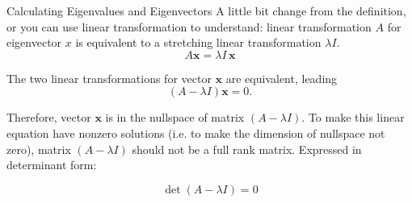 \documentclass{beamer}
\begin{document}
    \begin{frame}{Calculating Eigenvalues and Eigenvectors}
        A little bit change from the definition, or you can use linear transformation to understand: linear transformation $A$ for eigenvector $x$ is equivalent to a stretching linear transformation $\lambda I$.
        \begin{equation*}
            A \mathbf{x}=\lambda I \,\mathbf{x}
        \end{equation*}
        
        The two linear transformations for vector $\mathbf{x}$ are equivalent, leading
        \begin{equation*}
            \left(A-\lambda I \right) \mathbf{x}=0.
        \end{equation*}
        
        Therefore, vector $\mathbf{x}$ is in the nullspace of matrix $\left(A-\lambda I \right)$. To make this linear equation have nonzero solutions (i.e. to make the dimension of nullspace not zero), matrix $\left(A-\lambda I \right)$ should not be a full rank matrix. Expressed in determinant form:
        
        \begin{equation*}
            \det \left( A-\lambda I \right) =0
        \end{equation*}
        \end{frame}
        
\end{document}
